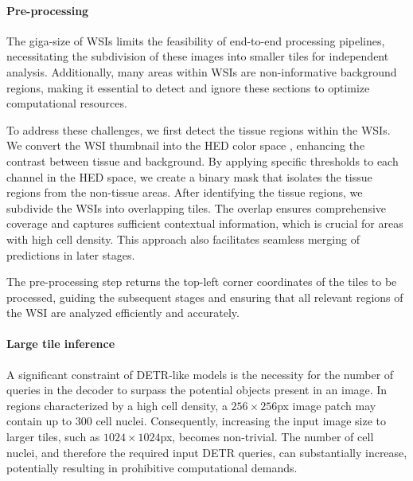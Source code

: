 \paragraph{Pre-processing} 
The giga-size of WSIs limits the feasibility of end-to-end processing pipelines, necessitating the subdivision of these images into smaller tiles for independent analysis. Additionally, many areas within WSIs are non-informative background regions, making it essential to detect and ignore these sections to optimize computational resources.

To address these challenges, we first detect the tissue regions within the WSIs. We convert the WSI thumbnail into the HED color space \cite{ruifrok2001quantification}, enhancing the contrast between tissue and background. By applying specific thresholds to each channel in the HED space, we create a binary mask that isolates the tissue regions from the non-tissue areas. After identifying the tissue regions, we subdivide the WSIs into overlapping tiles. The overlap ensures comprehensive coverage and captures sufficient contextual information, which is crucial for areas with high cell density. This approach also facilitates seamless merging of predictions in later stages.

The pre-processing step returns the top-left corner coordinates of the tiles to be processed, guiding the subsequent stages and ensuring that all relevant regions of the WSI are analyzed efficiently and accurately.

\paragraph{Large tile inference} A significant constraint of DETR-like models is the necessity for the number of queries in the decoder to surpass the potential objects present in an image. In regions characterized by a high cell density, a $256 \times 256$px image patch may contain up to 300 cell nuclei. Consequently, increasing the input image size to larger tiles, such as $1024 \times 1024$px, becomes non-trivial. The number of cell nuclei, and therefore the required input DETR queries, can substantially increase, potentially resulting in prohibitive computational demands.

